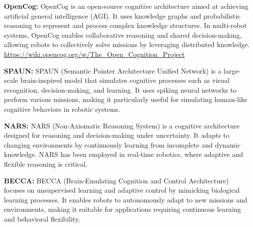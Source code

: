 \documentclass{book}
\begin{document}
            \textbf{OpenCog:} OpenCog is an open-source cognitive architecture aimed at achieving artificial general intelligence (AGI). It uses knowledge graphs and probabilistic reasoning to represent and process complex knowledge structures. In multi-robot systems, OpenCog enables collaborative reasoning and shared decision-making, allowing robots to collectively solve missions by leveraging distributed knowledge. \url{https://wiki.opencog.org/w/The_Open_Cognition_Project}

            \textbf{SPAUN:} SPAUN (Semantic Pointer Architecture Unified Network) is a large-scale brain-inspired model that simulates cognitive processes such as visual recognition, decision-making, and learning. It uses spiking neural networks to perform various missions, making it particularly useful for simulating human-like cognitive behaviors in robotic systems.

            \textbf{NARS:} NARS (Non-Axiomatic Reasoning System) is a cognitive architecture designed for reasoning and decision-making under uncertainty. It adapts to changing environments by continuously learning from incomplete and dynamic knowledge. NARS has been employed in real-time robotics, where adaptive and flexible reasoning is critical. 

            \textbf{BECCA:} BECCA (Brain-Emulating Cognition and Control Architecture) focuses on unsupervised learning and adaptive control by mimicking biological learning processes. It enables robots to autonomously adapt to new missions and environments, making it suitable for applications requiring continuous learning and behavioral flexibility.
\end{document}

